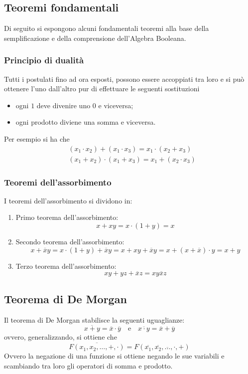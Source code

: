 \documentclass[a4paper]{extarticle}
\begin{document}
\vspace{1em}
\noindent
\subsection{Teoremi fondamentali}
Di seguito si espongono alcuni fondamentali teoremi alla base della semplificazione e della comprensione dell'Algebra Booleana.

\vspace{1em}
\noindent
\subsubsection{Principio di dualità}
Tutti i postulati fino ad ora esposti, possono essere accoppiati tra loro e si può ottenere l'uno dall'altro pur di effettuare le seguenti sostituzioni
\begin{itemize}
    \item ogni $1$ deve divenire uno $0$ e viceversa;
    \item ogni prodotto diviene una somma e viceversa.
\end{itemize}
Per esempio si ha che
\begin{align*}
    &(x_1 \cdot x_2) + (x_1 \cdot x_3) = x_1 \cdot (x_2 + x_3)\\
    &(x_1 + x_2) \cdot (x_1 + x_3) = x_1 + (x_2 \cdot x_3)
\end{align*}

\vspace{1em}
\noindent
\subsubsection{Teoremi dell'assorbimento}
I teoremi dell'assorbimento si dividono in:
\begin{enumerate}
    \item Primo teorema dell'assorbimento:
    \[x+xy=x \cdot (1+y)=x\]
    \item Secondo teorema dell'assorbimento:
    \[x+\overline{x} y = x \cdot (1+y)+\overline{x}y = x + xy + \overline{x}y = x + (x + \overline{x}) \cdot y = x+y\]
    \item Terzo teorema dell'assorbimento:
    \[xy+yz+\overline{x}z=xy\overline{x}z\]
\end{enumerate}

\vspace{1em}
\noindent
\subsection{Teorema di De Morgan}
Il teorema di De Morgan stabilisce la seguenti uguaglianze:
\[\overline{x+y}=\overline{x} \cdot \overline{y} \hspace{1em} \text{e} \hspace{1em} \overline{x \cdot y} = \overline{x} + \overline{y}\]
ovvero, generalizzando, si ottiene che
\[\overline{F(x_1,x_2,\dots,+,\cdot)} = F(\overline{x_1},\overline{x_2},\overline{\dots},\cdot,+)\]
Ovvero la negazione di una funzione si ottiene negando le sue variabili e scambiando tra loro gli operatori di somma e prodotto.
\end{document}
